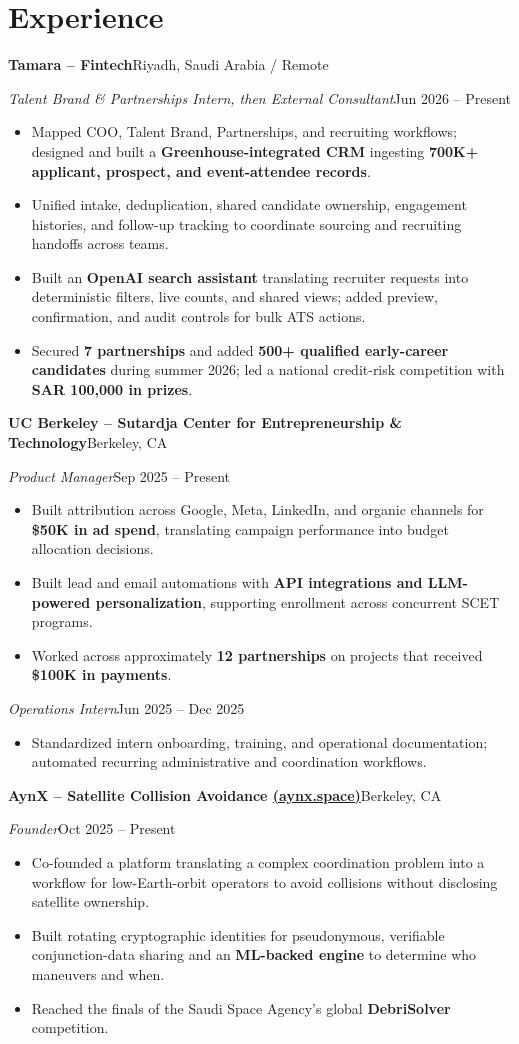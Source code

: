 \documentclass[a4paper,10pt]{article}
\newcommand{\entry}[4]{%
  \textbf{#1}\hfill #2\par
  \textit{#3}\hfill #4\par
}
\begin{document}
\section{Experience}
\entry{Tamara -- Fintech}{Riyadh, Saudi Arabia / Remote}
{Talent Brand \& Partnerships Intern, then External Consultant}{Jun 2026 -- Present}
\begin{itemize}
  \item Mapped COO, Talent Brand, Partnerships, and recruiting workflows; designed and built a \textbf{Greenhouse-integrated CRM} ingesting \textbf{700K+ applicant, prospect, and event-attendee records}.
  \item Unified intake, deduplication, shared candidate ownership, engagement histories, and follow-up tracking to coordinate sourcing and recruiting handoffs across teams.
  \item Built an \textbf{OpenAI search assistant} translating recruiter requests into deterministic filters, live counts, and shared views; added preview, confirmation, and audit controls for bulk ATS actions.
  \item Secured \textbf{7 partnerships} and added \textbf{500+ qualified early-career candidates} during summer 2026; led a national credit-risk competition with \textbf{SAR 100,000 in prizes}.
\end{itemize}
\entry{UC Berkeley -- Sutardja Center for Entrepreneurship \& Technology}{Berkeley, CA}
{Product Manager}{Sep 2025 -- Present}
\begin{itemize}
  \item Built attribution across Google, Meta, LinkedIn, and organic channels for \textbf{\$50K in ad spend}, translating campaign performance into budget allocation decisions.
  \item Built lead and email automations with \textbf{API integrations and LLM-powered personalization}, supporting enrollment across concurrent SCET programs.
  \item Worked across approximately \textbf{12 partnerships} on projects that received \textbf{\$100K in payments}.
\end{itemize}
\textit{Operations Intern}\hfill Jun 2025 -- Dec 2025\par
\begin{itemize}
  \item Standardized intern onboarding, training, and operational documentation; automated recurring administrative and coordination workflows.
\end{itemize}
\entry{AynX -- Satellite Collision Avoidance \;\href{https://aynx.space}{(aynx.space)}}{Berkeley, CA}
{Founder}{Oct 2025 -- Present}
\begin{itemize}
  \item Co-founded a platform translating a complex coordination problem into a workflow for low-Earth-orbit operators to avoid collisions without disclosing satellite ownership.
  \item Built rotating cryptographic identities for pseudonymous, verifiable conjunction-data sharing and an \textbf{ML-backed engine} to determine who maneuvers and when.
  \item Reached the finals of the Saudi Space Agency's global \textbf{DebriSolver} competition.
\end{itemize}
\end{document}
